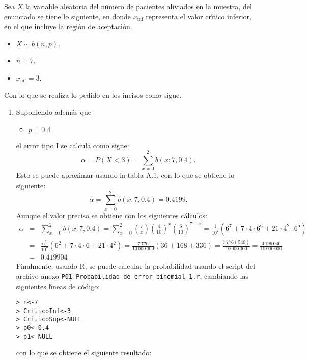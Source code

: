 \begin{solucion}
 Sea $X$ la variable aleatoria del n\'umero de pacientes aliviados en la muestra, del enunciado se tiene lo siguiente, en donde $x_{\text{inf}}$ representa el valor cr\'{\i}tico inferior, en el que incluye la regi\'on de aceptaci\'on.
 \begin{itemize}
  \item $X \sim b(n,p)$.
  \item $n = 7$.
  \item $x_{\text{inf}} = 3$.
 \end{itemize}
 Con lo que se realiza lo pedido en los incisos como sigue.
 \begin{enumerate}
  \item Suponiendo adem\'as que
  \begin{itemize}
   \item $p = 0.4$
  \end{itemize}
  el error tipo I se calcula como sigue:
  \begin{equation*}
   \alpha = P(X < 3) = \sum_{x=0}^{2} b(x;7,0.4).
  \end{equation*}
  Esto se puede aproximar usando la tabla A.1, con lo que se obtiene lo siguiente:
  \begin{equation*}
   \alpha = \sum_{x=0}^{2} b(x:7,0.4) = 0.4199.
  \end{equation*}
  Aunque el valor preciso se obtiene con los siguientes c\'alculos:
  \begin{eqnarray*}
   \alpha & = & \sum_{x=0}^{2} b(x:7,0.4) = \sum_{x=0}^{2} \binom{7}{x} \left( \frac{4}{10} \right)^x \left( \frac{6}{10} \right)^{7-x} = \frac{1}{10^7} \left(6^7 + 7\cdot 4\cdot 6^6 + 21\cdot 4^2 \cdot 6^5 \right) \\
   & = & \frac{6^5}{10^7} (6^2 + 7\cdot 4 \cdot 6 + 21 \cdot 4^2) = \frac{7\,776}{10\,000\,000}(36 + 168 + 336) = \frac{7\,776(540)}{10\,000\,000} = \frac{4\,199\,040}{10\,000\,000} \\
   & = & 0.419904
  \end{eqnarray*}
  Finalmente, usando R, se puede calcular la probabilidad usando el script del archivo anexo \texttt{P01\_Probabilidad\_de\_error\_binomial\_1.r}, cambiando las siguientes l\'{\i}neas de c\'odigo:
  \begin{verbatim}
> n<-7
> CriticoInf<-3
> CriticoSup<-NULL
> p0<-0.4
> p1<-NULL
  \end{verbatim}
  \vspace{-0.5cm}
  con lo que se obtiene el siguiente resultado:
  \begin{verbatim}

\end{verbatim}
\end{enumerate}
\end{solucion}
